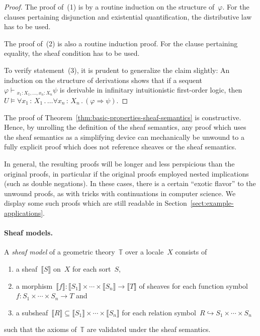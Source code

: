 \documentclass{ws-rv9x6}
\newcommand{\TT}{\mathbb{T}}
\renewcommand{\_}{\mathpunct{.}}
\newcommand{\?}{\,{:}\,}
\newcommand{\seq}[1]{\mathrel{\vdash\!\!\!_{#1}}}
\newcommand{\brak}[1]{{\llbracket{#1}\rrbracket}}
\begin{document}
\begin{proof}The proof of~(1) is by a routine induction on the structure
of~$\varphi$. For the clauses pertaining disjunction and existential
quantification, the distributive law has to be used.

The proof of~(2) is also a routine induction proof. For the clause pertaining
equality, the sheaf condition has to be used.

To verify statement~(3), it is prudent to generalize the claim slightly: An
induction on the structure of derivations shows that if a sequent~$\varphi
\seq{x_1{:}X_1,\ldots,x_n{:}X_n} \psi$ is derivable in infinitary intuitionistic first-order
logic, then~$U \models \forall x_1\?X_1\_ \ldots \forall x_n\?X_n\_ (\varphi
\Rightarrow \psi)$.
\end{proof}

\begin{remark}The proof of Theorem~\ref{thm:basic-properties-sheaf-semantics}
is constructive. Hence, by unrolling the definition of the sheaf semantics, any
proof which uses the sheaf semantics as a simplifying device can mechanically
be unwound to a fully explicit proof which does not reference sheaves or the
sheaf semantics.

In general, the resulting proofs will be longer and less perspicious
than the original proofs, in particular if the original proofs employed nested
implications (such as double negations). In these cases, there is a certain
``exotic flavor'' to the unwound proofs, as with tricks with continuations in
computer science. We display some such proofs which are still readable in
Section~\ref{sect:example-applications}.
\end{remark}


\paragraph{Sheaf models.}
\begin{definition}\label{defn:sheaf-model}
A \emph{sheaf model} of a geometric theory~$\TT$ over a locale~$X$ consists of
\begin{enumerate}
  \item a sheaf~$\brak{S}$ on~$X$ for each sort~$S$,
  \item a morphism~$\brak{f} : \brak{S_1} \times \cdots \times \brak{S_n} \to
  \brak{T}$ of sheaves for each function symbol~$f : S_1 \times \cdots \times S_n \to T$ and
  \item a subsheaf~$\brak{R} \subseteq \brak{S_1} \times \cdots \times \brak{S_n}$
  for each relation symbol~$R \hookrightarrow S_1 \times \cdots \times S_n$
\end{enumerate}
such that the axioms of~$\TT$ are validated under the sheaf semantics.
\end{definition}
\end{document}
